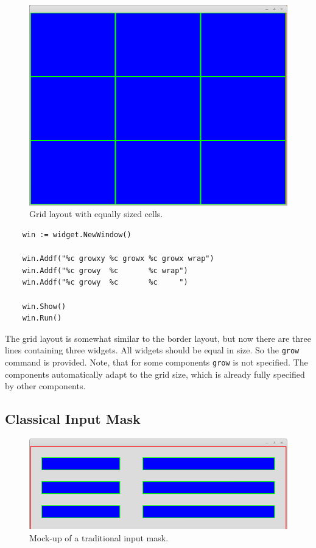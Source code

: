 \begin{figure}[ht]
\centering
\includegraphics[width=12cm]{img/gridlayout.png}
\caption{Grid layout with equally sized cells.}
\end{figure}

\begin{verbatim}
    win := widget.NewWindow()

    win.Addf("%c growxy %c growx %c growx wrap")
    win.Addf("%c growy  %c       %c wrap")
    win.Addf("%c growy  %c       %c     ")

    win.Show()
    win.Run()
\end{verbatim}

The grid layout is somewhat similar to the border layout, but now there
are three lines containing three widgets. All widgets should be equal in
size. So the \texttt{grow} command is provided. Note, that for some
components \texttt{grow} is not specified. The components automatically
adapt to the grid size, which is already fully specified by other
components.

\pagebreak

\subsection{Classical Input Mask}

\begin{figure}[ht]
\centering
\includegraphics[width=12cm]{img/inputmask.png}
\caption{Mock-up of a traditional input mask.}
\end{figure}

